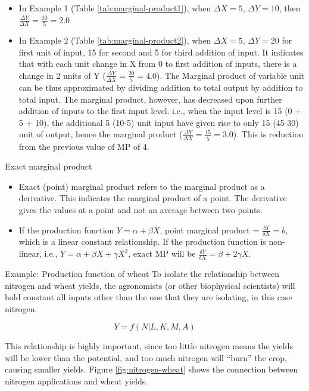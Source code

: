 \documentclass[12pt,ignorenonframetext,aspectratio=169]{beamer}
\providecommand{\tightlist}{%
  \setlength{\itemsep}{0pt}\setlength{\parskip}{0pt}}
\begin{document}
\begin{frame}{}
\protect\hypertarget{section-1}{}
\begin{itemize}
\tightlist
\item
  In Example 1 (Table \ref{tab:marginal-product1}), when
  \(\Delta X = 5\), \(\Delta Y = 10\), then
  \(\frac{\Delta Y}{\Delta X} = \frac{10}{5} = 2.0\)
\item
  In Example 2 (Table \ref{tab:marginal-product2}), when
  \(\Delta X = 5\), \(\Delta Y = 20\) for first unit of input, 15 for
  second and 5 for third addition of input. It indicates that with each
  unit change in X from 0 to first addition of inputs, there is a change
  in 2 units of Y (\(\frac{\Delta Y}{\Delta X} = \frac{20}{5} = 4.0\)).
  The Marginal product of variable unit can be thus approximated by
  dividing addition to total output by addition to total input. The
  marginal product, however, has decreased upon further addition of
  inputs to the first input level. i.e., when the input level is 15 (0 +
  5 + 10), the additional 5 (10-5) unit input have given rise to only 15
  (45-30) unit of output, hence the marginal product
  (\(\frac{\Delta Y}{\Delta X} = \frac{15}{5} = 3.0\)). This is
  reduction from the previous value of MP of 4.
\end{itemize}
\end{frame}

\begin{frame}{Exact marginal product}
\protect\hypertarget{exact-marginal-product}{}
\begin{itemize}
\item
  Exact (point) marginal product refers to the marginal product as a
  derivative. This indicates the marginal product of a point. The
  derivative gives the values at a point and not an average between two
  points.
\item
  If the production function \(Y = \alpha + \beta X\), point marginal
  product = \(\frac{\delta Y}{\delta X} = b\), which is a linear
  constant relationship. If the production function is non-linear, i.e.,
  \(Y = \alpha + \beta X + \gamma X^2\), exact MP will be
  \(\frac{\delta Y}{\delta X} = \beta + 2\gamma X\).
\end{itemize}
\end{frame}

\begin{frame}{Example: Production function of wheat}
\protect\hypertarget{example-production-function-of-wheat}{}
To isolate the relationship between nitrogen and wheat yields, the
agronomists (or other biophysical scientists) will hold constant all
inputs other than the one that they are isolating, in this case
nitrogen.

\[Y = f(N | L, K, M, A)\]

This relationship is highly important, since too little nitrogen means
the yields will be lower than the potential, and too much nitrogen will
``burn'' the crop, causing smaller yields. Figure
\ref{fig:nitrogen-wheat} shows the connection between nitrogen
applications and wheat yields.
\end{frame}
\end{document}
